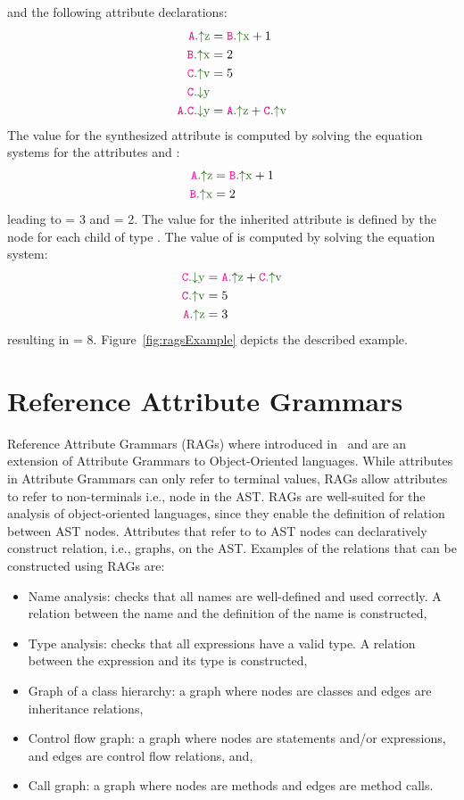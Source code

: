 and the following attribute declarations:
    \begin{align*}
        \Asyn{A}{z}& = \Asyn{B}{x} + 1 \\
        \Asyn{B}{x}& = 2 \\
        \Asyn{C}{v}& = 5 \\
        \Ainh{C}{y}& \\
        \Ainhdef{A}{C}{y}& = \Asyn{A}{z} + \Asyn{C}{v} \\
    \end{align*}
The value for the synthesized attribute  is computed by solving 
the equation systems for the attributes  and :
\begin{align*}
    \Asyn{A}{z} &= \Asyn{B}{x} + 1 \\
    \Asyn{B}{x} &= 2
\end{align*}
leading to  = 3 and  = 2.
The value for the inherited attribute  is defined by the node  for
each child of type . The value of  is computed by solving the equation system:
\begin{align*}
    \Ainh{C}{y} &= \Asyn{A}{z} + \Asyn{C}{v} \\
    \Asyn{C}{v} &= 5\\
    \Asyn{A}{z} &= 3
\end{align*}
resulting in  = 8. Figure~\ref{fig:ragsExample} depicts the described example.


\section{Reference Attribute Grammars}
\label{sec:rag}
Reference Attribute Grammars (RAGs) where introduced in~\cite{DBLP:journals/informaticaSI/Hedin00}
and are an extension of Attribute Grammars to Object-Oriented languages. While attributes in Attribute Grammars
can only refer to terminal values, RAGs allow attributes to refer to non-terminals i.e., node in the AST.
RAGs are well-suited for the analysis of object-oriented languages, since they enable 
the definition of relation between AST nodes. Attributes that refer to 
to AST nodes can declaratively construct relation, i.e., graphs, on the AST.
Examples of the relations that can be constructed using RAGs are:
\begin{itemize}
    \item Name analysis: checks that all names are well-defined and used correctly. A relation between 
    the name and the definition of the name is constructed,
    \item Type analysis: checks that all expressions have a valid type. A relation between the expression
    and its type is constructed,
    \item Graph of a class hierarchy: a graph where nodes are classes and edges are inheritance relations,
    \item Control flow graph: a graph where nodes are statements and/or expressions, and edges are control flow relations, and,
    \item Call graph: a graph where nodes are methods and edges are method calls.
\end{itemize}

